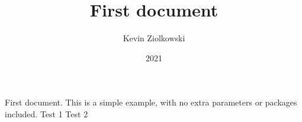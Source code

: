 \documentclass[12pt]{article}
\title{First document}
\author{Kevin Ziolkowski}
\date{2021}
\begin{document}
First document. This is a simple example, with no 
extra parameters or packages included.
Test 1
Test 2
\end{document}
